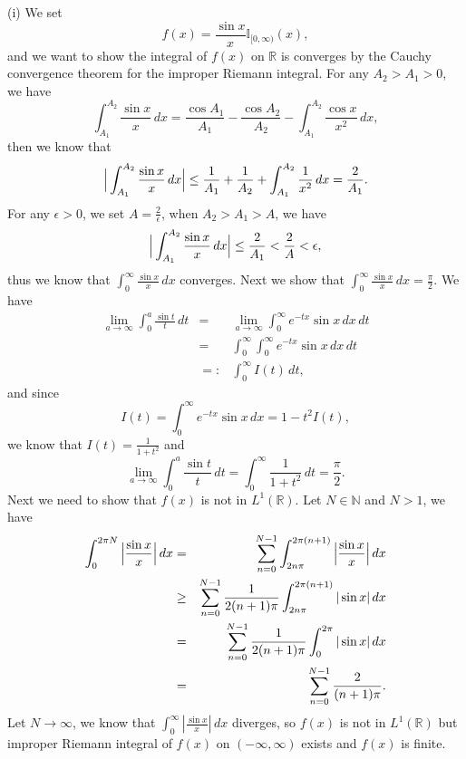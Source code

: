 \documentclass[12pt,a4paper]{ctexart}
\begin{document}
(i) We set
\begin{equation*}
    f(x) = \frac{\sin x}{x} \mathbb{I}_{[0, \infty)} (x),
\end{equation*}
and we want to show the integral of $f(x)$ on $\mathbb{R}$ is converges by the Cauchy convergence theorem for the improper Riemann integral. For any $A_{2} > A_{1} > 0$, we have
\begin{equation*}
    \int_{A_{1}}^{A_{2}} \frac{\sin x}{x} \, d x = \frac{\cos A_{1}}{A_{1}} - \frac{\cos A_{2}}{A_{2}} - \int_{A_{1}}^{A_{2}} \frac{\cos x}{x^{2}} \, d x,
\end{equation*}
then we know that
\begin{equation*}
    \Big{|} \int_{A_{1}}^{A_{2}} \frac{\sin x}{x} \, d x \Big{|} \leq \frac{1}{A_{1}} + \frac{1}{A_{2}} + \int_{A_{1}}^{A_{2}} \frac{1}{x^{2}} \, d x = \frac{2}{A_{1}}.
\end{equation*}
For any $\epsilon > 0$, we set $A = \frac{2}{\epsilon}$, when $A_{2} > A_{1} > A$, we have
\begin{equation*}
    \Big{|} \int_{A_{1}}^{A_{2}} \frac{\sin x}{x} \, d x \Big{|} \leq \frac{2}{A_{1}} < \frac{2}{A} < \epsilon,
\end{equation*} 
thus we know that $\int_{0}^{\infty} \frac{\sin x}{x} \, d x$ converges. Next we show that $\int_{0}^{\infty} \frac{\sin x}{x} \, d x = \frac{\pi}{2}$. We have
\begin{eqnarray*}
    \lim_{a \to \infty} \int_{0}^{a} \frac{\sin t}{t} \, d t & = & \lim_{a \to \infty} \int_{0}^{\infty} e^{- t x} \sin x \, d x \, d t \\
    & = & \int_{0}^{\infty} \int_{0}^{\infty} e^{- t x} \sin x \, d x \, d t  \\
    & =: & \int_{0}^{\infty} I(t) \, d t,
\end{eqnarray*}
and since
\begin{equation*}
    I(t) = \int_{0}^{\infty} e^{- t x} \sin x \, d x = 1 - t^{2} I(t),
\end{equation*}
we know that $I(t) = \frac{1}{1+ t^{2}}$ and
\begin{equation*}
    \lim_{a \to \infty} \int_{0}^{a} \frac{\sin t}{t} \, d t = \int_{0}^{\infty} \frac{1}{1+ t^{2}} \, d t = \frac{\pi}{2}.
\end{equation*}
Next we need to show that $f(x)$ is not in $L^{1}(\mathbb{R})$. Let $N \in \mathbb{N}$ and $N > 1$, we have
\begin{eqnarray*}
    \int_{0}^{2 \pi N} \Big{|} \frac{\sin x}{x} \Big{|} \, d x & = & \sum_{n=0}^{N-1} \int_{2n \pi}^{2 \pi (n+1)} \Big{|} \frac{\sin x}{x} \Big{|} \, d x  \\
    & \geq & \sum_{n=0}^{N-1} \frac{1}{2(n+1) \pi} \int_{2n \pi}^{2 \pi (n+1)} |\sin x| \, d x \\
    & = & \sum_{n=0}^{N-1} \frac{1}{2(n+1) \pi} \int_{0}^{2 \pi} |\sin x| \, d x \\
    & = & \sum_{n=0}^{N-1} \frac{2}{(n+1) \pi}.
\end{eqnarray*}
Let $N \to \infty$, we know that $\int_{0}^{\infty} |\frac{\sin x}{x}| \, d x $ diverges, so $f(x)$ is not in $L^{1}(\mathbb{R})$ but improper Riemann integral of $f(x)$ on $(-\infty, \infty)$ exists and $f(x)$ is finite.
\end{document}
